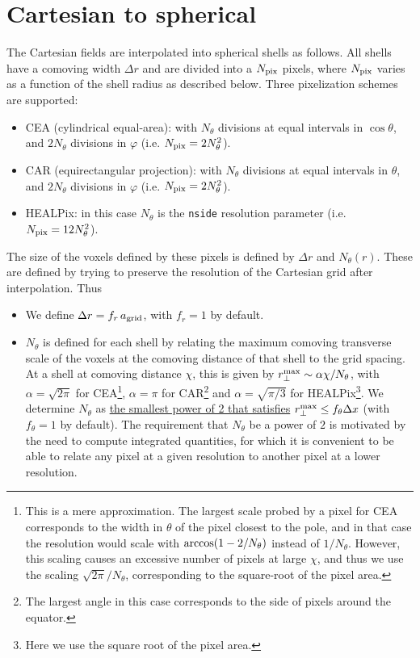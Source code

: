 \documentclass[a4paper,10pt]{article}
\begin{document}
\section{Cartesian to spherical}
  The Cartesian fields are interpolated into spherical shells as follows. All shells have a comoving width $\Delta r$ and are divided into a $N_{\rm pix}$ pixels, where $N_{\rm pix}$ varies as a function of the shell radius as described below. Three pixelization schemes are supported:
  \begin{itemize}
    \item CEA (cylindrical equal-area): with $N_\theta$ divisions at
      equal intervals in $\cos\theta$, and $2N_\theta$ divisions in
      $\varphi$ (i.e. $N_{\rm pix}=2N_\theta^2$).
    \item CAR (equirectangular projection):  with $N_\theta$ divisions at
      equal intervals in $\theta$, and $2N_\theta$ divisions in
      $\varphi$ (i.e. $N_{\rm pix}=2N_\theta^2$).
    \item HEALPix: in this case $N_\theta$ is the {\tt nside} resolution
      parameter (i.e. $N_{\rm pix}=12N_\theta^2$).
  \end{itemize}
  The size of the voxels defined by these pixels is defined by $\Delta r$ and $N_\theta(r)$. These are defined by trying to preserve the resolution of the Cartesian grid after interpolation. Thus
  \begin{itemize}
    \item We define $\Delta r=f_r\,a_{\rm grid}$, with $f_r=1$ by default.
    \item $N_\theta$ is defined for each shell by relating the maximum comoving transverse scale of the voxels at the comoving distance of that shell to the grid spacing. At a shell at comoving distance $\chi$, this is given by $r_\perp^{\rm max}\sim\alpha\chi/N_\theta$, with $\alpha=\sqrt{2\pi}$ for CEA\footnote{This is a mere approximation. The largest scale probed by a pixel for CEA corresponds to the width in $\theta$ of the pixel closest to the pole, and in that case the resolution would scale with ${\rm arccos}(1-2/N_\theta)$ instead of $1/N_\theta$. However, this scaling causes an excessive number of pixels at large $\chi$, and thus we use the scaling $\sqrt{2\pi}/N_\theta$, corresponding to the square-root of the pixel area.}, $\alpha=\pi$ for CAR\footnote{The largest angle in this case corresponds to the side of pixels around the equator.} and $\alpha=\sqrt{\pi/3}$ for HEALPix\footnote{Here we use the square root of the pixel area.}. We determine $N_\theta$ as \underline{the smallest power of 2 that satisfies} $r_\perp^{\rm max}\leq f_\theta\Delta x$ (with $f_\theta=1$ by default). The requirement that $N_\theta$ be a power of $2$ is motivated by the need to compute integrated quantities, for which it is convenient to be able to relate any pixel at a given resolution to another pixel at a lower resolution.
  \end{itemize}
\end{document}
